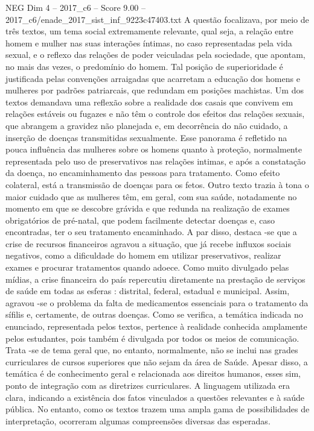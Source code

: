 \begin{textsample}{NEG Dim 4 – 2017\_c6 – Score 9.00 – 2017\_c6/enade\_2017\_sist\_inf\_9223c47403.txt}
A questão focalizava, por meio de três textos, um tema social extremamente relevante, qual seja, a relação entre homem e mulher nas suas interações íntimas, no caso representadas pela vida sexual, e o reflexo das relações de poder veiculadas pela sociedade, que apontam, no mais das vezes, o predomínio do homem.
Tal posição de superioridade é justificada pelas convenções arraigadas que acarretam a educação dos homens e mulheres por padrões patriarcais, que redundam em posições machistas.
Um dos textos demandava uma reflexão sobre a realidade dos casais que convivem em relações estáveis ou fugazes e não têm o controle dos efeitos das relações sexuais, que abrangem a gravidez não planejada e, em decorrência do não cuidado, a inserção de doenças transmitidas sexualmente.
Esse panorama é refletido na pouca influência das mulheres sobre os homens quanto à proteção, normalmente representada pelo uso de preservativos nas relações intimas, e após a constatação da doença, no encaminhamento das pessoas para tratamento.
Como efeito colateral, está a transmissão de doenças para os fetos.
Outro texto trazia à tona o maior cuidado que as mulheres têm, em geral, com sua saúde, notadamente no momento em que se descobre grávida e que redunda na realização de exames obrigatórios de pré-natal, que podem facilmente detectar doenças e, caso encontradas, ter o seu tratamento encaminhado.
A par disso, destaca -se que a crise de recursos financeiros agravou a situação, que já recebe influxos sociais negativos, como a dificuldade do homem em utilizar preservativos, realizar exames e procurar tratamentos quando adoece.
Como muito divulgado pelas mídias, a crise financeira do país repercutiu diretamente na prestação de serviços de saúde em todas as esferas : distrital, federal, estadual e municipal.
Assim, agravou -se o problema da falta de medicamentos essenciais para o tratamento da sífilis e, certamente, de outras doenças.
Como se verifica, a temática indicada no enunciado, representada pelos textos, pertence à realidade conhecida amplamente pelos estudantes, pois também é divulgada por todos os meios de comunicação.
Trata -se de tema geral que, no entanto, normalmente, não se inclui nas grades curriculares de cursos superiores que não sejam da área de Saúde.
Apesar disso, a temática é de conhecimento geral e relacionada aos direitos humanos, esses sim, ponto de integração com as diretrizes curriculares.
A linguagem utilizada era clara, indicando a existência dos fatos vinculados a questões relevantes e à saúde pública.
No entanto, como os textos trazem uma ampla gama de possibilidades de interpretação, ocorreram algumas compreensões diversas das esperadas.

\end{textsample}
